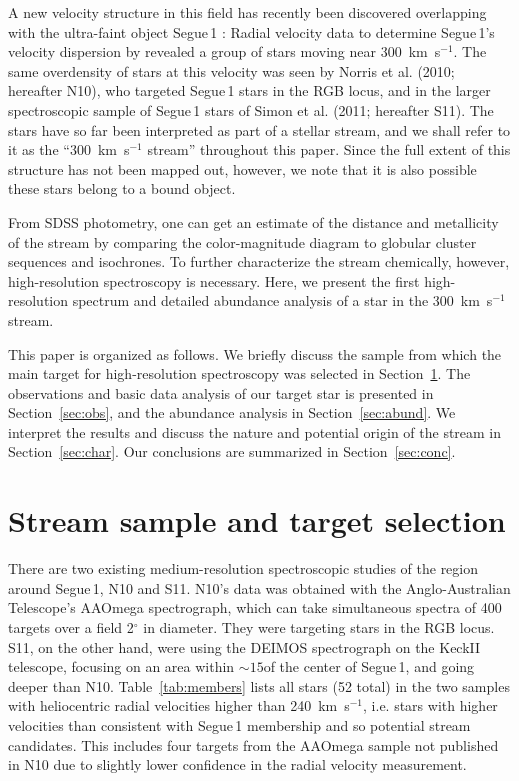 \documentclass[manuscript]{aastex}
\begin{document}
A new velocity structure in this field has recently been discovered overlapping with the ultra-faint object Segue\,1 \citep{Belokurov2007}: Radial velocity data to determine Segue\,1's velocity dispersion by \citet{Geha2009} revealed a group of stars moving near 300~km~s$^{-1}$. The same overdensity of stars at this velocity was seen by Norris et al. (2010; hereafter N10)\nocite{Norris2010a}, who targeted Segue\,1 stars in the RGB locus, and in the larger spectroscopic sample of Segue\,1 stars of Simon et al. (2011; hereafter S11)\nocite{Simon2011}. The stars have so far been interpreted as part of a stellar stream, and we shall refer to it as the ``300~km~s$^{-1}$ stream'' throughout this paper. Since the full extent of this structure has not been mapped out, however, we note that it is also possible these stars belong to a bound object.

From SDSS photometry, one can get an estimate of the distance and metallicity of the stream by comparing the color-magnitude diagram to globular cluster sequences and isochrones. To further characterize the stream chemically, however, high-resolution spectroscopy is necessary. Here, we present the first high-resolution spectrum and detailed abundance analysis of a star in the 300~km~s$^{-1}$ stream.

This paper is organized as follows. We briefly discuss the sample from which the main target for high-resolution spectroscopy was selected in Section~\ref{sec:medres}. The observations and basic data analysis of our target star is presented in Section~\ref{sec:obs}, and the abundance analysis in Section~\ref{sec:abund}. We interpret the results and discuss the nature and potential origin of the stream in Section~\ref{sec:char}. Our conclusions are summarized in Section~\ref{sec:conc}.
\section{Stream sample and target selection}
\label{sec:medres}


There are two existing medium-resolution spectroscopic studies of the region around Segue\,1, N10 and S11. N10's data was obtained with the Anglo-Australian Telescope's AAOmega spectrograph, which can take simultaneous spectra of 400 targets over a field 2$^{\circ}$ in diameter. They were targeting stars in the RGB locus. S11, on the other hand, were using the {\small DEIMOS} spectrograph on the KeckII telescope, focusing on an area within $\sim 15$\arcmin of the center of Segue\,1, and going deeper than N10. Table~\ref{tab:members} lists all stars (52 total) in the two samples with heliocentric radial velocities higher than 240~km~s$^{-1}$, i.e. stars with higher velocities than consistent with Segue\,1 membership and so potential stream candidates. This includes four targets from the AAOmega sample not published in N10 due to slightly lower confidence in the radial velocity measurement.
\end{document}
